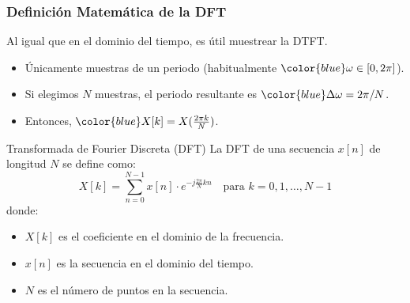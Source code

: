 \documentclass{beamer}
\numberwithin{section}{part}
\begin{document}
\begin{frame}
  \frametitle{Definición Matemática de la DFT}
  Al igual que en el dominio del tiempo, es útil muestrear la DTFT.
  \begin{itemize}
    \item Únicamente muestras de un periodo (habitualmente $\color{blue}\omega\in[0,2\pi]$).
    \item Si elegimos $N$ muestras, el periodo resultante es $\color{blue}\Delta\omega=2\pi/N$.
    \item Entonces, $\color{blue}X[k]=X(\frac{2\pi k}{N})$.
  \end{itemize}

  \begin{alertblock}{Transformada de Fourier Discreta (DFT)}
    La DFT de una secuencia \( x[n] \) de longitud \( N \) se define como:
    \[
    X[k] = \sum_{n=0}^{N-1} x[n] \cdot e^{-j \frac{2\pi}{N} kn} \quad \text{para } k = 0, 1, \dots, N-1  
    \]
    donde:
    \begin{itemize}
        \item \( X[k] \) es el coeficiente en el dominio de la frecuencia.
        \item \( x[n] \) es la secuencia en el dominio del tiempo.
        \item \( N \) es el número de puntos en la secuencia.
    \end{itemize}
  \end{alertblock}
\end{frame}    
\end{document}
